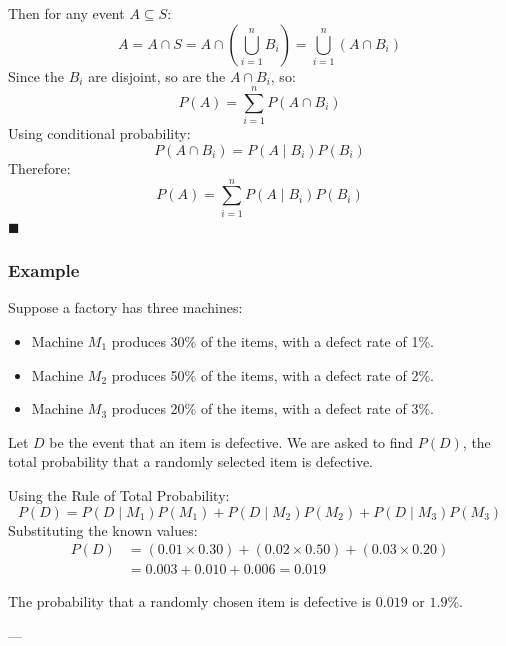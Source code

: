 \documentclass[twoside]{book}
\begin{document}
Then for any event \( A \subseteq S \):
\[
A = A \cap S = A \cap \left( \bigcup_{i=1}^n B_i \right) = \bigcup_{i=1}^n (A \cap B_i)
\]
Since the \( B_i \) are disjoint, so are the \( A \cap B_i \), so:
\[
P(A) = \sum_{i=1}^n P(A \cap B_i)
\]
Using conditional probability:
\[
P(A \cap B_i) = P(A \mid B_i)P(B_i)
\]
Therefore:
\[
P(A) = \sum_{i=1}^n P(A \mid B_i)P(B_i)
\]
\hfill\(\blacksquare\)

\subsubsection{Example}

Suppose a factory has three machines:

\begin{itemize}
    \item Machine \( M_1 \) produces 30\% of the items, with a defect rate of 1\%.
    \item Machine \( M_2 \) produces 50\% of the items, with a defect rate of 2\%.
    \item Machine \( M_3 \) produces 20\% of the items, with a defect rate of 3\%.
\end{itemize}

Let \( D \) be the event that an item is defective. We are asked to find \( P(D) \), the total probability that a randomly selected item is defective.

Using the Rule of Total Probability:
\[
P(D) = P(D \mid M_1)P(M_1) + P(D \mid M_2)P(M_2) + P(D \mid M_3)P(M_3)
\]
Substituting the known values:
\begin{align*}
    P(D) &= (0.01 \times 0.30) + (0.02 \times 0.50) + (0.03 \times 0.20) \\
    &= 0.003 + 0.010 + 0.006 = 0.019
\end{align*}

The probability that a randomly chosen item is defective is $0.019$ or $1.9$\%.

---
\end{document}
